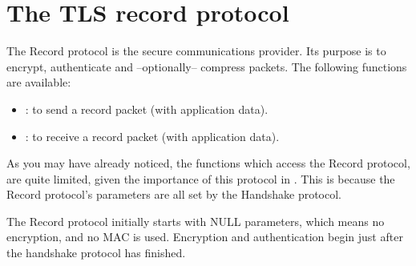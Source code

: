 \section{The TLS record protocol}

The Record protocol is the secure communications provider. Its purpose
is to encrypt, authenticate and --optionally-- compress packets.
The following functions are available:
\par
\begin{itemize}
\item {}:
to send a record packet (with application data).
\item {}:
to receive a record packet (with application data).
\end{itemize}

As you may have already noticed, the functions which access the Record protocol,
are quite limited, given the importance of this protocol in \tls{}.
This is because the Record protocol's parameters are all set by
the Handshake protocol.
\par
The Record protocol initially starts with NULL parameters, which means
no encryption, and no MAC is used. Encryption and authentication begin
just after the handshake protocol has finished.







